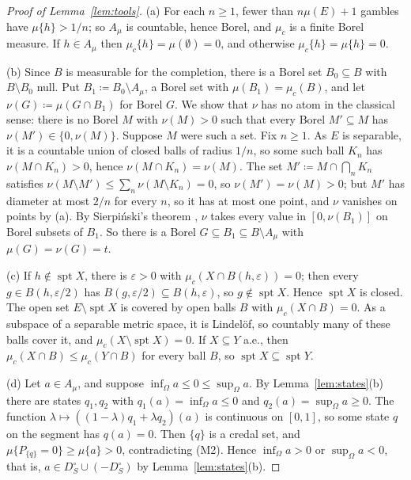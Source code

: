 \documentclass[11pt]{article}
\DeclareMathOperator{\spt}{spt}
\theoremstyle{plain}
\theoremstyle{definition}
\begin{document}
\begin{proof}[Proof of Lemma~\ref{lem:tools}]
(a) For each $n\ge1$, fewer than $n\mu(E)+1$ gambles have $\mu\{h\}>1/n$; so $A_\mu$ is
countable, hence Borel, and $\mu_c$ is a finite Borel measure. If $h\in A_\mu$ then
$\mu_c\{h\}=\mu(\emptyset)=0$, and otherwise $\mu_c\{h\}=\mu\{h\}=0$.

(b) Since $B$ is measurable for the completion, there is a Borel set $B_0\subseteq B$ with
$B\setminus B_0$ null. Put $B_1\coloneqq B_0\setminus A_\mu$, a Borel set with $\mu(B_1)=
\mu_c(B)$, and let $\nu(G)\coloneqq\mu(G\cap B_1)$ for Borel $G$. We show that $\nu$ has no
atom in the classical sense: there is no Borel $M$ with $\nu(M)>0$ such that every Borel
$M'\subseteq M$ has $\nu(M')\in\{0,\nu(M)\}$. Suppose $M$ were such a set. Fix $n\ge1$. As $E$
is separable, it is a countable union of closed balls of radius $1/n$, so some such ball $K_n$
has $\nu(M\cap K_n)>0$, hence $\nu(M\cap K_n)=\nu(M)$. The set $M'\coloneqq M\cap\bigcap_nK_n$
satisfies $\nu(M\setminus M')\le\sum_n\nu(M\setminus K_n)=0$, so $\nu(M')=\nu(M)>0$; but $M'$
has diameter at most $2/n$ for every $n$, so it has at most one point, and $\nu$ vanishes on
points by (a). By Sierpi\'nski's theorem \cite{Sierpinski}, $\nu$ takes every value in
$[0,\nu(B_1)]$ on Borel subsets of $B_1$. So there is a Borel $G\subseteq B_1\subseteq
B\setminus A_\mu$ with $\mu(G)=\nu(G)=t$.

(c) If $h\notin\spt X$, there is $\varepsilon>0$ with $\mu_c(X\cap B(h,\varepsilon))=0$; then
every $g\in B(h,\varepsilon/2)$ has $B(g,\varepsilon/2)\subseteq B(h,\varepsilon)$, so
$g\notin\spt X$. Hence $\spt X$ is closed. The open set $E\setminus\spt X$ is covered by open
balls $B$ with $\mu_c(X\cap B)=0$. As a subspace of a separable metric space, it is Lindel\"of,
so countably many of these balls cover it, and $\mu_c(X\setminus\spt X)=0$. If $X\subseteq Y$
a.e., then $\mu_c(X\cap B)\le\mu_c(Y\cap B)$ for every ball $B$, so $\spt X\subseteq\spt Y$.

(d) Let $a\in A_\mu$, and suppose $\inf_\Omega a\le0\le\sup_\Omega a$. By
Lemma~\ref{lem:states}(b) there are states $q_1,q_2$ with $q_1(a)=\inf_\Omega a\le0$ and
$q_2(a)=\sup_\Omega a\ge0$. The function $\lambda\mapsto((1-\lambda)q_1+\lambda q_2)(a)$ is
continuous on $[0,1]$, so some state $q$ on the segment has $q(a)=0$. Then $\{q\}$ is a credal
set, and $\mu\{P_{\{q\}}=0\}\ge\mu\{a\}>0$, contradicting (M2). Hence $\inf_\Omega a>0$ or
$\sup_\Omega a<0$, that is, $a\in D_S^\circ\cup(-D_S^\circ)$ by Lemma~\ref{lem:states}(b).
\end{proof}
\end{document}
